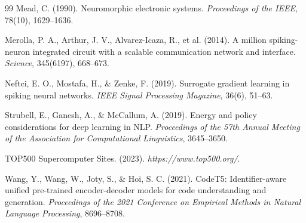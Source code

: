 \documentclass[11pt,a4paper]{article}
\begin{document}
\begin{thebibliography}{99}
Mead, C. (1990).
Neuromorphic electronic systems.
\textit{Proceedings of the IEEE}, 78(10), 1629--1636.

Merolla, P. A., Arthur, J. V., Alvarez-Icaza, R., et al. (2014).
A million spiking-neuron integrated circuit with a scalable communication network and interface.
\textit{Science}, 345(6197), 668--673.

Neftci, E. O., Mostafa, H., \& Zenke, F. (2019).
Surrogate gradient learning in spiking neural networks.
\textit{IEEE Signal Processing Magazine}, 36(6), 51--63.

Strubell, E., Ganesh, A., \& McCallum, A. (2019).
Energy and policy considerations for deep learning in NLP.
\textit{Proceedings of the 57th Annual Meeting of the Association for Computational Linguistics}, 3645--3650.

TOP500 Supercomputer Sites. (2023).
\textit{https://www.top500.org/}.

Wang, Y., Wang, W., Joty, S., \& Hoi, S. C. (2021).
CodeT5: Identifier-aware unified pre-trained encoder-decoder models for code understanding and generation.
\textit{Proceedings of the 2021 Conference on Empirical Methods in Natural Language Processing}, 8696--8708.

\end{thebibliography}
\end{document}

